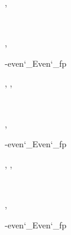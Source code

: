 \documentclass[a4paper]{article}
\begin{document}
\begin{alectryon}
\begin{sentence}
\begin{output}
\begin{goals}
\begin{goal}
\begin{conclusion}
          \end{conclusion}
        \end{goal}
      \end{goals}
    \end{output}
  \end{sentence}
  \sep
  \begin{sentence}
    \begin{input}
      ~~~~~\PY{o}{[}~~\PY{o}{[}~~~\PY{o}{]}~\PY{o}{];}~
    \end{input}
    \sep
    \begin{output}
      \begin{goals}
        \begin{goal}
          \begin{hyps}
            \hyp{even\char`\_Even\char`\_fp}{~~~\nl
            ~~~~~~}
          \end{hyps}
          \sep
          \infrule{}
          \sep
          \begin{conclusion}
            ~~~~~
          \end{conclusion}
        \end{goal}
        \sep
        \begin{extragoals}
          \begin{goal}
            \begin{hyps}
              \hyp{even\char`\_Even\char`\_fp}{~~~\nl
              ~~~~~~}
            \end{hyps}
            \sep
            \infrule{}
            \sep
            \begin{conclusion}
              ~~~~~
            \end{conclusion}
          \end{goal}
          \sep
          \begin{goal}
            \begin{hyps}
              \hyp{even\char`\_Even\char`\_fp}{~~~\nl
}
\end{hyps}
\end{goal}
\end{extragoals}
\end{goals}
\end{output}
\end{sentence}
\end{alectryon}
\end{document}
